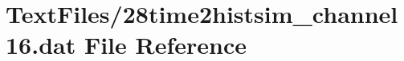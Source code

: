 \hypertarget{28time2histsim__channel16_8dat}{}\section{Text\+Files/28time2histsim\+\_\+channel16.dat File Reference}
\label{28time2histsim__channel16_8dat}
